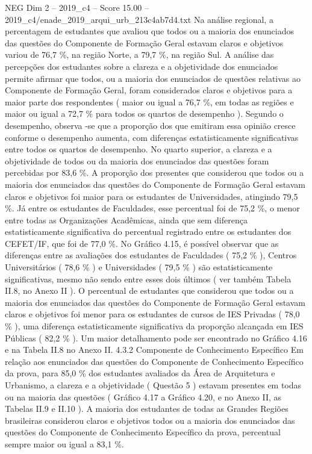 \begin{textsample}{NEG Dim 2 – 2019\_c4 – Score 15.00 – 2019\_c4/enade\_2019\_arqui\_urb\_213c4ab7d4.txt}
Na análise regional, a percentagem de estudantes que avaliou que todos ou a maioria dos enunciados das questões do Componente de Formação Geral estavam claros e objetivos variou de 76,7 \%, na região Norte, a 79,7 \%, na região Sul.
A análise das percepções dos estudantes sobre a clareza e a objetividade dos enunciados permite afirmar que todos, ou a maioria dos enunciados de questões relativas ao Componente de Formação Geral, foram considerados claros e objetivos para a maior parte dos respondentes ( maior ou igual a 76,7 \%, em todas as regiões e maior ou igual a 72,7 \% para todos os quartos de desempenho ).
Segundo o desempenho, observa -se que a proporção dos que emitiram essa opinião cresce conforme o desempenho aumenta, com diferenças estatisticamente significativas entre todos os quartos de desempenho.
No quarto superior, a clareza e a objetividade de todos ou da maioria dos enunciados das questões foram percebidas por 83,6 \%.
A proporção dos presentes que considerou que todos ou a maioria dos enunciados das questões do Componente de Formação Geral estavam claros e objetivos foi maior para os estudantes de Universidades, atingindo 79,5 \%.
Já entre os estudantes de Faculdades, esse percentual foi de 75,2 \%, o menor entre todas as Organizações Acadêmicas, ainda que sem diferença estatisticamente significativa do percentual registrado entre os estudantes dos CEFET/IF, que foi de 77,0 \%.
No Gráfico 4.15, é possível observar que as diferenças entre as avaliações dos estudantes de Faculdades ( 75,2 \% ), Centros Universitários ( 78,6 \% ) e Universidades ( 79,5 \% ) são estatisticamente significativas, mesmo não sendo entre esses dois últimos ( ver também Tabela II.8, no Anexo II ).
O percentual de estudantes que considerou que todos ou a maioria dos enunciados das questões do Componente de Formação Geral estavam claros e objetivos foi menor para os estudantes de cursos de IES Privadas ( 78,0 \% ), uma diferença estatisticamente significativa da proporção alcançada em IES Públicas ( 82,2 \% ).
Um maior detalhamento pode ser encontrado no Gráfico 4.16 e na Tabela II.8 no Anexo II. 4.3.2 Componente de Conhecimento Específico Em relação aos enunciados das questões do Componente de Conhecimento Específico da prova, para 85,0 \% dos estudantes avaliados da Área de Arquitetura e Urbanismo, a clareza e a objetividade ( Questão 5 ) estavam presentes em todas ou na maioria das questões ( Gráfico 4.17 a Gráfico 4.20, e no Anexo II, as Tabelas II.9 e II.10 ).
A maioria dos estudantes de todas as Grandes Regiões brasileiras considerou claros e objetivos todos ou a maioria dos enunciados das questões do Componente de Conhecimento Específico da prova, percentual sempre maior ou igual a 83,1 \%.

\end{textsample}
